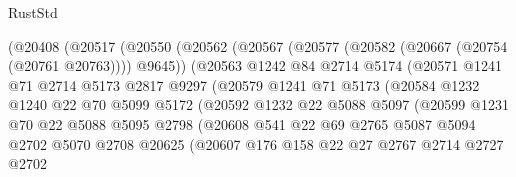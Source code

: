 \begin{lexlean}{RustStd}
\begin{coremodule}
                    (@20408
                      (@20517
                        (@20550
                          (@20562
                            (@20567 (@20577 (@20582 (@20667 (@20754 (@20761 @20763)))) @9645))
                            (@20563
                              @1242
                              @84
                              @2714
                              @5174
                              (@20571
                                @1241
                                @71
                                @2714
                                @5173
                                @2817
                                @9297
                                (@20579
                                  @1241
                                  @71
                                  @5173
                                  (@20584
                                    @1232
                                    @1240
                                    @22
                                    @70
                                    @5099
                                    @5172
                                    (@20592
                                      @1232
                                      @22
                                      @5088
                                      @5097
                                      (@20599
                                        @1231
                                        @70
                                        @22
                                        @5088
                                        @5095
                                        @2798
                                        (@20608
                                          @541
                                          @22
                                          @69
                                          @2765
                                          @5087
                                          @5094
                                          @2702
                                          @5070
                                          @2708
                                          @20625
                                          (@20607
                                            @176
                                            @158
                                            @22
                                            @27
                                            @2767
                                            @2714
                                            @2727
                                            @2702

\end{coremodule}
\end{lexlean}
